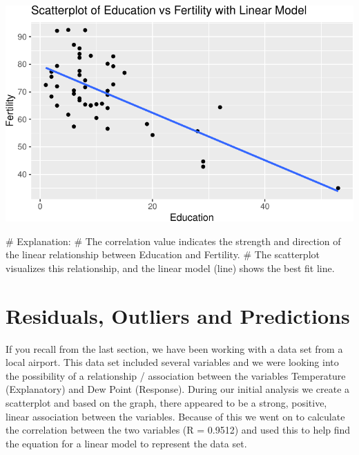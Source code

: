 \documentclass[
  letterpaper,
  DIV=11,
  numbers=noendperiod]{scrreprt}
\newenvironment{Shaded}{\begin{snugshade}}{\end{snugshade}}
\newcommand{\CommentTok}[1]{\textcolor[rgb]{0.37,0.37,0.37}{#1}}
\begin{document}
\includegraphics{Linear_Modeling_and_Regression_files/figure-pdf/unnamed-chunk-25-1.pdf}

\begin{Shaded}
\begin{Highlighting}[]
\CommentTok{\# Explanation:}
\CommentTok{\# The correlation value indicates the strength and direction of the linear relationship between Education and Fertility.}
\CommentTok{\# The scatterplot visualizes this relationship, and the linear model (line) shows the best fit line.}
\end{Highlighting}
\end{Shaded}


\chapter*{Residuals, Outliers and
Predictions}\label{residuals-outliers-and-predictions}


If you recall from the last section, we have been working with a data
set from a local airport. This data set included several variables and
we were looking into the possibility of a relationship / association
between the variables Temperature (Explanatory) and Dew Point
(Response). During our initial analysis we create a scatterplot and
based on the graph, there appeared to be a strong, positive, linear
association between the variables. Because of this we went on to
calculate the correlation between the two variables (R = 0.9512) and
used this to help find the equation for a linear model to represent the
data set.
\end{document}
